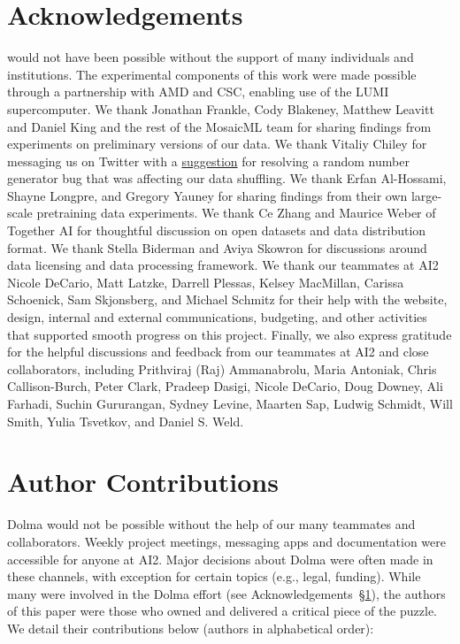 
\section{Acknowledgements}
\label{sec:ack}

\dolma would not have been possible without the support of many individuals and institutions. 
The experimental components of this work were made possible through a partnership with AMD and CSC, enabling use of the LUMI supercomputer.
We thank Jonathan Frankle, Cody Blakeney, Matthew Leavitt and Daniel King and the rest of the MosaicML team for sharing findings from experiments on preliminary versions of our data.
We thank Vitaliy Chiley for messaging us on Twitter with a \href{https://twitter.com/vitaliychiley/status/1675594766799769600}{suggestion} for resolving a random number generator bug that was affecting our data shuffling.
We thank Erfan Al-Hossami, Shayne Longpre, and Gregory Yauney for sharing findings from their own large-scale pretraining data experiments.
We thank Ce Zhang and Maurice Weber of Together AI for thoughtful discussion on open datasets and data distribution format.
We thank Stella Biderman and Aviya Skowron for discussions around data licensing and data processing framework.
We thank our teammates at AI2 Nicole DeCario, Matt Latzke, Darrell Plessas, Kelsey MacMillan, Carissa Schoenick, Sam Skjonsberg, and Michael Schmitz for their help with the website, design, internal and external communications, budgeting, and other activities that supported smooth progress on this project.
Finally, we also express gratitude for the helpful discussions and feedback from our teammates at AI2 and close collaborators, including Prithviraj (Raj) Ammanabrolu, Maria Antoniak, Chris Callison-Burch, Peter Clark, Pradeep Dasigi, Nicole DeCario, Doug Downey, Ali Farhadi, Suchin Gururangan, Sydney Levine, Maarten Sap, Ludwig Schmidt, Will Smith, Yulia Tsvetkov, and Daniel S. Weld.

\section{Author Contributions}
\label{sec:contrib}

Dolma would not be possible without the help of our many teammates and collaborators. Weekly project meetings, messaging apps and documentation were accessible for anyone at AI2. Major decisions about Dolma were often made in these channels, with exception for certain topics (e.g., legal, funding). While many were involved in the Dolma effort (see Acknowledgements~\S\ref{sec:ack}), the authors of this paper were those who owned and delivered a critical piece of the puzzle. We detail their contributions below (authors in alphabetical order):

